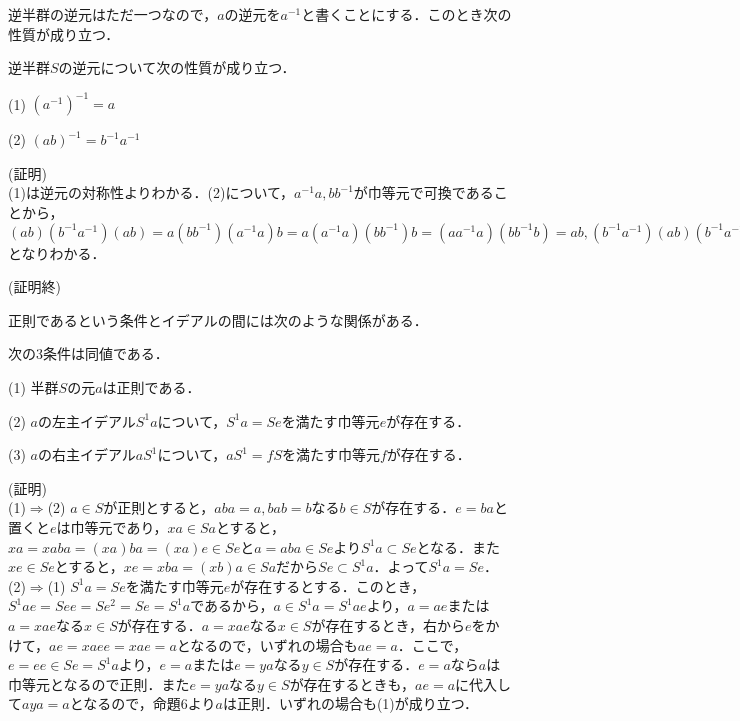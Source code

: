 逆半群の逆元はただ一つなので，$a$の逆元を$a^{-1}$と書くことにする．このとき次の性質が成り立つ．
\begin{sprop}
逆半群$S$の逆元について次の性質が成り立つ．
\begin{description}
\item{(1)} $(a^{-1})^{-1}=a$
\item{(2)} $(ab)^{-1}=b^{-1}a^{-1}$
\end{description}
\end{sprop}
(証明)\\
(1)は逆元の対称性よりわかる．(2)について，$a^{-1}a,bb^{-1}$が巾等元で可換であることから，
$(ab)(b^{-1}a^{-1})(ab)=a(bb^{-1})(a^{-1}a)b=a(a^{-1}a)(bb^{-1})b=(aa^{-1}a)(bb^{-1}b)=ab,(b^{-1}a^{-1})(ab)(b^{-1}a^{-1})=b^{-1}(a^{-1}a)(bb^{-1})a^{-1}=b^{-1}(bb^{-1})(a^{-1}a)a^{-1}=(b^{-1}bb^{-1})(a^{-1}aa^{-1})=b^{-1}a^{-1}$となりわかる．
\begin{flushright}
(証明終)
\end{flushright}
正則であるという条件とイデアルの間には次のような関係がある．
\begin{sprop}
次の3条件は同値である．
\begin{description}
\item{(1)} 半群$S$の元$a$は正則である．
\item{(2)} $a$の左主イデアル$S^1a$について，$S^1a=Se$を満たす巾等元$e$が存在する．
\item{(3)} $a$の右主イデアル$aS^1$について，$aS^1=fS$を満たす巾等元$f$が存在する．
\end{description}
\end{sprop}
(証明)\\
(1)$\Rightarrow$(2) $a\in S$が正則とすると，$aba=a,bab=b$なる$b\in S$が存在する．$e=ba$と置くと$e$は巾等元であり，$xa\in Sa$とすると，$xa=xaba=(xa)ba=(xa)e\in Se$と$a=aba\in Se$より$S^1a\subset Se$となる．また$xe\in Se$とすると，$xe=xba=(xb)a\in Sa$だから$Se\subset S^1a$．よって$S^1a=Se$．\\
(2)$\Rightarrow$(1) $S^1a=Se$を満たす巾等元$e$が存在するとする．このとき，$S^1ae=See=Se^2=Se=S^1a$であるから，$a\in S^1a=S^1ae$より，$a=ae$または$a=xae$なる$x\in S$が存在する．$a=xae$なる$x\in S$が存在するとき，右から$e$をかけて，$ae=xaee=xae=a$となるので，いずれの場合も$ae=a$．ここで，$e=ee\in Se=S^1a$より，$e=a$または$e=ya$なる$y\in S$が存在する．$e=a$なら$a$は巾等元となるので正則．また$e=ya$なる$y\in S$が存在するときも，$ae=a$に代入して$aya=a$となるので，命題6より$a$は正則．いずれの場合も(1)が成り立つ．\\

